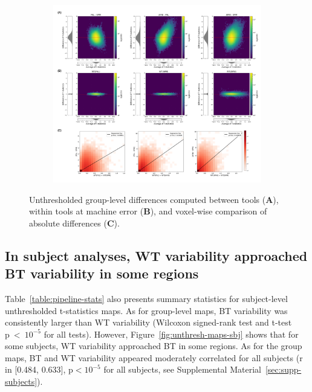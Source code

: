 \documentclass[11pt,onecolumn]{article}
\begin{document}
\begin{figure}[ht]
  \centering
  \begin{subfigure}[ht]{.9\textwidth}
    \centering
    \includegraphics[width=.9\textwidth]{figures/gl-unthresh.png}
  \end{subfigure}
  \caption{Unthresholded group-level differences computed between tools
    (\textbf{A}), within tools at machine error (\textbf{B}),
    and voxel-wise comparison of absolute differences (\textbf{C}). }
  \label{fig:unthresh-maps}
\end{figure}


\subsection{In subject analyses, WT variability approached BT variability in some regions}

Table~\ref{table:pipeline-stats} also presents summary statistics for
subject-level unthresholded t-statistics maps. As for group-level maps,
BT variability was consistently larger than WT variability (Wilcoxon
signed-rank test and t-test p~\textless~$10^{-5}$ for all tests).
However, Figure~\ref{fig:unthresh-maps-sbj} shows that for
some subjects, WT variability approached %
BT in some regions. As for the group maps, BT and WT
variability appeared moderately correlated for all subjects (r in [0.484,
    0.633], p$< 10^{-5}$ for all subjects, see Supplemental Material~\ref{sec:supp-subjects}).
\end{document}
